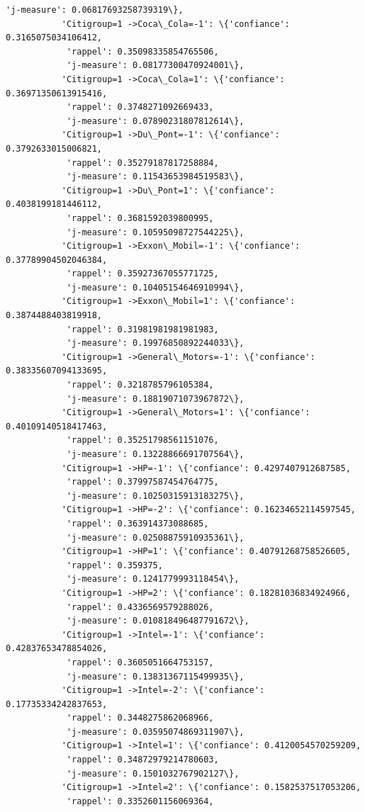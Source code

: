 \documentclass[11pt]{article}
\begin{document}
\begin{Verbatim}[commandchars=\\\{\}]
            'j-measure': 0.06817693258739319\},
           'Citigroup=1 ->Coca\_Cola=-1': \{'confiance': 0.3165075034106412,
            'rappel': 0.35098335854765506,
            'j-measure': 0.08177300470924001\},
           'Citigroup=1 ->Coca\_Cola=1': \{'confiance': 0.36971350613915416,
            'rappel': 0.3748271092669433,
            'j-measure': 0.07890231807812614\},
           'Citigroup=1 ->Du\_Pont=-1': \{'confiance': 0.3792633015006821,
            'rappel': 0.35279187817258884,
            'j-measure': 0.11543653984519583\},
           'Citigroup=1 ->Du\_Pont=1': \{'confiance': 0.4038199181446112,
            'rappel': 0.3681592039800995,
            'j-measure': 0.10595098727544225\},
           'Citigroup=1 ->Exxon\_Mobil=-1': \{'confiance': 0.37789904502046384,
            'rappel': 0.35927367055771725,
            'j-measure': 0.10405154646910994\},
           'Citigroup=1 ->Exxon\_Mobil=1': \{'confiance': 0.3874488403819918,
            'rappel': 0.31981981981981983,
            'j-measure': 0.19976850892244033\},
           'Citigroup=1 ->General\_Motors=-1': \{'confiance': 0.38335607094133695,
            'rappel': 0.3218785796105384,
            'j-measure': 0.18819071073967872\},
           'Citigroup=1 ->General\_Motors=1': \{'confiance': 0.40109140518417463,
            'rappel': 0.35251798561151076,
            'j-measure': 0.13228866691707564\},
           'Citigroup=1 ->HP=-1': \{'confiance': 0.4297407912687585,
            'rappel': 0.37997587454764775,
            'j-measure': 0.10250315913183275\},
           'Citigroup=1 ->HP=-2': \{'confiance': 0.16234652114597545,
            'rappel': 0.363914373088685,
            'j-measure': 0.02508875910935361\},
           'Citigroup=1 ->HP=1': \{'confiance': 0.40791268758526605,
            'rappel': 0.359375,
            'j-measure': 0.1241779993118454\},
           'Citigroup=1 ->HP=2': \{'confiance': 0.18281036834924966,
            'rappel': 0.4336569579288026,
            'j-measure': 0.010818496487791672\},
           'Citigroup=1 ->Intel=-1': \{'confiance': 0.42837653478854026,
            'rappel': 0.3605051664753157,
            'j-measure': 0.13831367115499935\},
           'Citigroup=1 ->Intel=-2': \{'confiance': 0.17735334242837653,
            'rappel': 0.3448275862068966,
            'j-measure': 0.03595074869311907\},
           'Citigroup=1 ->Intel=1': \{'confiance': 0.4120054570259209,
            'rappel': 0.34872979214780603,
            'j-measure': 0.1501032767902127\},
           'Citigroup=1 ->Intel=2': \{'confiance': 0.1582537517053206,
            'rappel': 0.3352601156069364,

\end{Verbatim}
\end{document}
